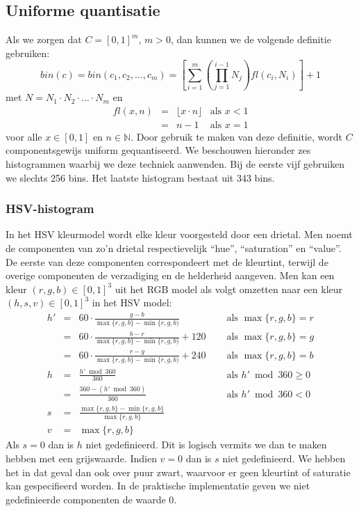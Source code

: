\subsection{Uniforme quantisatie}

Als we zorgen dat $C=[0,1]^m$, $m > 0$, dan kunnen we 
de volgende definitie gebruiken:
$$
bin(c) = bin(c_1,c_2,\ldots,c_m) = \left[ \sum_{i=1}^m \left( \prod_{j=1}^{i-1} N_j \right) \mathit{fl}(c_i, N_i) \right] + 1
$$
met $N=N_1 \cdot N_2 \cdot \ldots \cdot N_m$ en
$$
\begin{array}{rcll}
\mathit{fl}(x,n) & = & \lfloor x \cdot n \rfloor & \textrm{als } x < 1 \\
				 & = & n - 1 & \textrm{als } x = 1
\end{array}
$$
voor alle $x \in [0,1]$ en $n \in \mathbb{N}$.
Door gebruik te maken van deze definitie, wordt $C$ componentsgewijs uniform gequantiseerd. We beschouwen
hieronder zes histogrammen waarbij we deze techniek aanwenden. Bij de eerste vijf gebruiken 
we slechts 256 bins. Het laatste histogram bestaat uit 343 bins.

\subsubsection{HSV-histogram}

In het HSV kleurmodel \cite{tkalcic:colour_spaces} wordt elke kleur voorgesteld door een drietal. Men noemt de componenten van 
zo'n drietal respectievelijk ``hue'', ``saturation'' en ``value''. De eerste van deze componenten
correspondeert met de kleurtint, terwijl de overige componenten de verzadiging en de helderheid
aangeven. Men kan een kleur $(r,g,b) \in [0,1]^3$ uit het RGB model als volgt omzetten naar een 
kleur $(h,s,v) \in [0,1]^3$ in het HSV model:
$$
\begin{array}{rcll}
h' & = & 60 \cdot \frac{g - b}{\max \{r,g,b\} - \min \{r,g,b)}\quad & \textrm{ als } \max \{r,g,b\} = r \\[2pt]
  & = & 60 \cdot \frac{b - r}{\max \{r,g,b\} - \min \{r,g,b)} + 120\quad & \textrm{ als } \max \{r,g,b\} = g \\[2pt]
  & = & 60 \cdot \frac{r - g}{\max \{r,g,b\} - \min \{r,g,b)} + 240\quad & \textrm{ als } \max \{r,g,b\} = b \\[6pt]
h & = & \frac{h' \bmod 360}{360} & \textrm{ als } h' \bmod 360 \geq 0 \\[2pt]
  & = & \frac{360 - (h' \bmod 360)}{360} & \textrm{ als } h' \bmod 360 < 0 \\[6pt]
s & = & \frac{\max \{r,g,b\} - \min \{r,g,b\}}{\max \{r,g,b\}} & \\[6pt]
v & = & \max \{r,g,b\}
\end{array}
$$
Als $s=0$ dan is $h$ niet gedefinieerd. Dit is logisch vermits we dan te maken hebben met een 
grijswaarde. Indien $v=0$ dan is $s$ niet gedefinieerd. We hebben het in dat geval dan ook over 
puur zwart, waarvoor er geen kleurtint of saturatie kan gespecifieerd worden. In de praktische
implementatie geven we niet gedefinieerde componenten de waarde $0$.

